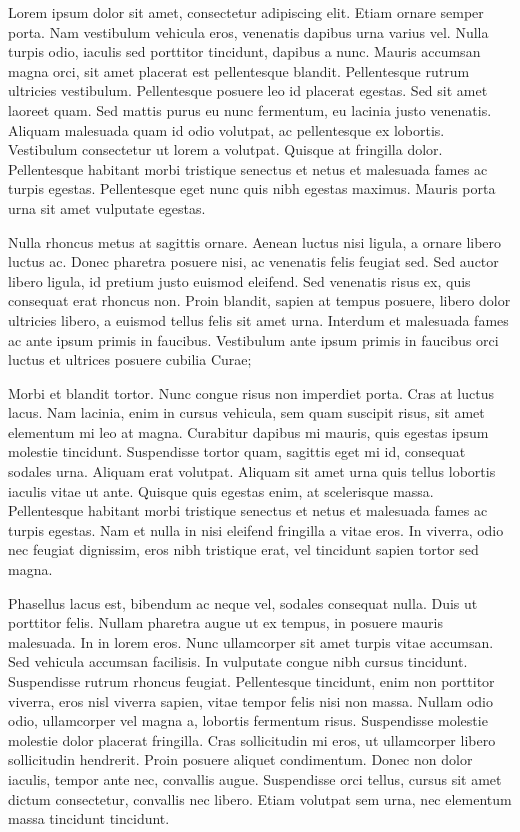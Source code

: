 Lorem ipsum dolor sit amet, consectetur adipiscing elit. Etiam ornare semper porta. Nam vestibulum vehicula eros, venenatis dapibus urna varius vel. Nulla turpis odio, iaculis sed porttitor tincidunt, dapibus a nunc. Mauris accumsan magna orci, sit amet placerat est pellentesque blandit. Pellentesque rutrum ultricies vestibulum. Pellentesque posuere leo id placerat egestas. Sed sit amet laoreet quam. Sed mattis purus eu nunc fermentum, eu lacinia justo venenatis. Aliquam malesuada quam id odio volutpat, ac pellentesque ex lobortis. Vestibulum consectetur ut lorem a volutpat. Quisque at fringilla dolor. Pellentesque habitant morbi tristique senectus et netus et malesuada fames ac turpis egestas. Pellentesque eget nunc quis nibh egestas maximus. Mauris porta urna sit amet vulputate egestas.

Nulla rhoncus metus at sagittis ornare. Aenean luctus nisi ligula, a ornare libero luctus ac. Donec pharetra posuere nisi, ac venenatis felis feugiat sed. Sed auctor libero ligula, id pretium justo euismod eleifend. Sed venenatis risus ex, quis consequat erat rhoncus non. Proin blandit, sapien at tempus posuere, libero dolor ultricies libero, a euismod tellus felis sit amet urna. Interdum et malesuada fames ac ante ipsum primis in faucibus. Vestibulum ante ipsum primis in faucibus orci luctus et ultrices posuere cubilia Curae;

Morbi et blandit tortor. Nunc congue risus non imperdiet porta. Cras at luctus lacus. Nam lacinia, enim in cursus vehicula, sem quam suscipit risus, sit amet elementum mi leo at magna. Curabitur dapibus mi mauris, quis egestas ipsum molestie tincidunt. Suspendisse tortor quam, sagittis eget mi id, consequat sodales urna. Aliquam erat volutpat. Aliquam sit amet urna quis tellus lobortis iaculis vitae ut ante. Quisque quis egestas enim, at scelerisque massa. Pellentesque habitant morbi tristique senectus et netus et malesuada fames ac turpis egestas. Nam et nulla in nisi eleifend fringilla a vitae eros. In viverra, odio nec feugiat dignissim, eros nibh tristique erat, vel tincidunt sapien tortor sed magna.

Phasellus lacus est, bibendum ac neque vel, sodales consequat nulla. Duis ut porttitor felis. Nullam pharetra augue ut ex tempus, in posuere mauris malesuada. In in lorem eros. Nunc ullamcorper sit amet turpis vitae accumsan. Sed vehicula accumsan facilisis. In vulputate congue nibh cursus tincidunt. Suspendisse rutrum rhoncus feugiat. Pellentesque tincidunt, enim non porttitor viverra, eros nisl viverra sapien, vitae tempor felis nisi non massa. Nullam odio odio, ullamcorper vel magna a, lobortis fermentum risus. Suspendisse molestie molestie dolor placerat fringilla. Cras sollicitudin mi eros, ut ullamcorper libero sollicitudin hendrerit. Proin posuere aliquet condimentum. Donec non dolor iaculis, tempor ante nec, convallis augue. Suspendisse orci tellus, cursus sit amet dictum consectetur, convallis nec libero. Etiam volutpat sem urna, nec elementum massa tincidunt tincidunt.

